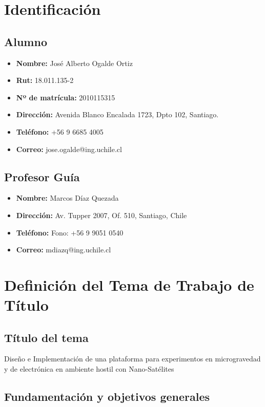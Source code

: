 \documentclass[11pt,letterpaper]{article}
\begin{document}
\section{Identificación}

\subsection{Alumno}

\begin{itemize}
	\item \textbf{Nombre:} Jos\'e Alberto Ogalde Ortiz
	\item \textbf{Rut:} 18.011.135-2
	\item \textbf{Nº de matrícula:} 2010115315
	\item \textbf{Dirección:} Avenida Blanco Encalada 1723, Dpto 102, Santiago.
	\item \textbf{Tel\'efono:} +56 9 6685 4005
	\item \textbf{Correo:} jose.ogalde@ing.uchile.cl
\end{itemize}

\subsection{Profesor Guía}

\begin{itemize}
	\item \textbf{Nombre:} Marcos Díaz Quezada
	\item \textbf{Dirección:} Av. Tupper 2007, Of. 510, Santiago, Chile
	\item \textbf{Teléfono:} Fono: +56 9 9051 0540
	\item \textbf{Correo:} mdiazq@ing.uchile.cl
\end{itemize}

\newpage
\section{Definición del Tema de Trabajo de Título}

\subsection{Título del tema}

Diseño e Implementación de una plataforma para experimentos en microgravedad y de electrónica en ambiente hostil con Nano-Sat\'elites

\subsection{Fundamentación y objetivos generales}
\end{document}
